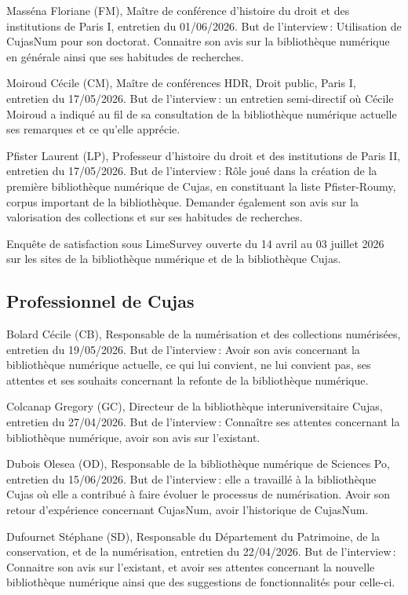 Masséna Floriane (FM), Maître de conférence d’histoire du droit et des institutions de Paris I, entretien du 01/06/2026. But de l’interview : Utilisation de CujasNum pour son doctorat. Connaitre son avis sur la bibliothèque numérique en générale ainsi que ses habitudes de recherches. 

Moiroud Cécile (CM), Maître de conférences HDR, Droit public, Paris I, entretien du 17/05/2026. But de l’interview : un entretien semi-directif où Cécile Moiroud a indiqué au fil de sa consultation de la bibliothèque numérique actuelle ses remarques et ce qu’elle apprécie. 

Pfister Laurent (LP), Professeur d’histoire du droit et des institutions de Paris II, entretien du 17/05/2026. But de l’interview : Rôle joué dans la création de la première bibliothèque numérique de Cujas, en constituant la liste Pfister-Roumy, corpus important de la bibliothèque. Demander également son avis sur la valorisation des collections et sur ses habitudes de recherches. 

Enquête de satisfaction sous LimeSurvey ouverte du 14 avril au 03 juillet 2026 sur les sites de la bibliothèque numérique et de la bibliothèque Cujas.   



\subsection*{Professionnel de Cujas} 

Bolard Cécile (CB), Responsable de la numérisation et des collections numérisées, entretien du 19/05/2026. But de l’interview : Avoir son avis concernant la bibliothèque numérique actuelle, ce qui lui convient, ne lui convient pas, ses attentes et ses souhaits concernant la refonte de la bibliothèque numérique.  

Colcanap Gregory (GC), Directeur de la bibliothèque interuniversitaire Cujas, entretien du 27/04/2026. But de l’interview : Connaître ses attentes concernant la bibliothèque numérique, avoir son avis sur l’existant. 

Dubois Olesea (OD), Responsable de la bibliothèque numérique de Sciences Po, entretien du 15/06/2026. But de l’interview : elle a travaillé à la bibliothèque Cujas où elle a contribué à faire évoluer le processus de numérisation. Avoir son retour d’expérience concernant CujasNum, avoir l’historique de CujasNum. 

Dufournet Stéphane (SD), Responsable du Département du Patrimoine, de la conservation, et de la numérisation, entretien du 22/04/2026. But de l’interview : Connaitre son avis sur l’existant, et avoir ses attentes concernant la nouvelle bibliothèque numérique ainsi que des suggestions de fonctionnalités pour celle-ci. 


